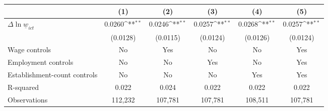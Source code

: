 {
\def\sym#1{\ifmmode^{#1}\else\(^{#1}\)\fi}
\begin{tabular}{l*{5}{c}}
\hline\hline
          &\multicolumn{1}{c}{(1)}         &\multicolumn{1}{c}{(2)}         &\multicolumn{1}{c}{(3)}         &\multicolumn{1}{c}{(4)}         &\multicolumn{1}{c}{(5)}         \\
\hline
$\Delta \ln \underline{w}_{ict}$&   0.0260\sym{**} &   0.0246\sym{**} &   0.0257\sym{**} &   0.0268\sym{**} &   0.0257\sym{**} \\
          & (0.0128)         & (0.0115)         & (0.0124)         & (0.0126)         & (0.0124)         \\
\hline
Wage controls&       No         &      Yes         &       No         &       No         &      Yes         \\
Employment controls&       No         &       No         &      Yes         &       No         &      Yes         \\
Establishment-count controls&       No         &       No         &       No         &      Yes         &      Yes         \\
R-squared &    0.022         &    0.024         &    0.022         &    0.022         &    0.022         \\
Observations&  112,232         &  107,781         &  107,781         &  108,511         &  107,781         \\
\hline\hline
\end{tabular}
}
